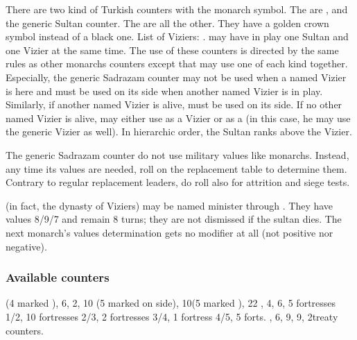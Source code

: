  There are two kind of Turkish
counters with the monarch symbol.
\bparag The  are \leaderSuleyman, \leaderSelim and the
generic Sultan counter.
\bparag The  are all the other. They have a golden crown
symbol instead of a black one.
\bparag List of Viziers: .
\bparag \TUR may have in play one Sultan and one Vizier at the same
time. The use of these counters is directed by the same rules as other
monarchs counters except that \TUR may use one of each kind together.
\bparag Especially, the generic Sadrazam counter may not be used when
a named Vizier is here and \leaderSinan must be used on its \LeaderC
side when another named Vizier is in play.
\bparag Similarly, if another named Vizier is alive, \leaderSinan must
be used on its \LeaderC side. If no other named Vizier is alive, \TUR
may either use \leaderSinan as a Vizier or as a \LeaderC (in this
case, he may use the generic Vizier as well).
\bparag In hierarchic order, the Sultan ranks above the Vizier.

\aparag[] [BLP] The generic Sadrazam counter do not use military
values like monarchs.
\bparag Instead, any time its values are needed, roll on the
replacement table to determine them.
\bparag Contrary to regular replacement leaders, do roll also for
attrition and siege tests.

 (in fact, the dynasty of Viziers) may
be named minister through . They have values
8/9/7 and remain 8 turns; they are not dismissed if the sultan dies. The
next monarch's values determination gets no modifier at all (not
positive nor negative).

\subsubsection{Available counters}
\ARMY (4 marked \Timar), 6\FLEET, 2\corsaire, 10\LDND
(5 marked \Timar on \LD side), 10\LD (5 marked \Timar), 22 \Pashas, 4\NTD,
6\LDENDE, 5 fortresses 1/2, 10 fortresses 2/3, 2 fortresses 3/4, 1
fortress 4/5, 5 forts.
\COL, 6\TP, 9\MNU, 9\TradeFLEET, 2\ROTW treaty
counters.



